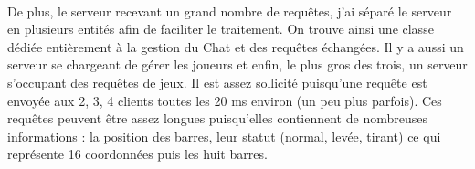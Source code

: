 \documentclass[a4paper,12pt]{report}
\begin{document}
\paragraph{}
De plus, le serveur recevant un grand nombre de requêtes, j'ai séparé le serveur en plusieurs entités afin de faciliter le traitement. On trouve ainsi une classe dédiée entièrement à la gestion du Chat et des requêtes échangées. Il y a aussi un serveur se chargeant de gérer les joueurs et enfin, le plus gros des trois, un serveur s'occupant des requêtes de jeux. Il est assez sollicité puisqu'une requête est envoyée aux 2, 3, 4 clients toutes les 20 ms environ (un peu plus parfois). Ces requêtes peuvent être assez longues puisqu'elles contiennent de nombreuses informations : la position des barres, leur statut (normal, levée, tirant) ce qui représente 16 coordonnées puis les huit barres.
\end{document}
